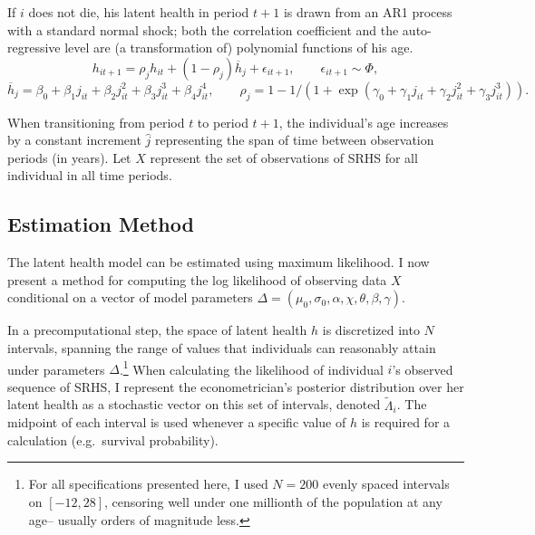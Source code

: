 \documentclass[12pt,pdftex,letterpaper]{article}
\newcommand{\Health}{h}
\newcommand{\ExpHealth}{\overline{\Health}}
\newcommand{\Age}{j}
\newcommand{\AgeIncr}{\hat{\Age}}
\newcommand{\Corr}{\rho}
\newcommand{\HealthInitMean}{\mu_0}
\newcommand{\HealthInitStd}{\sigma_0}
\newcommand{\Cut}{\chi}
\newcommand{\MortParam}{\theta}
\newcommand{\CorrParam}{\gamma}
\newcommand{\HealthParam}{\beta}
\newcommand{\LatentParam}{\alpha}
\newcommand{\HealthShock}{\epsilon}
\newcommand{\Data}{X}
\newcommand{\ParamVec}{\Delta}
\newcommand{\HealthDstnPcvd}{\widetilde{\Lambda}}
\begin{document}
If $i$ does not die, his latent health in period $t+1$ is drawn from an AR1 process with a standard normal shock; both the correlation coefficient and the auto-regressive level are (a transformation of) polynomial functions of his age.
\begin{equation}\label{HealthNext}
\Health_{it+1} = \Corr_{j} \Health_{it} + (1-\Corr_j) \ExpHealth_\Age + \HealthShock_{it+1}, \qquad \HealthShock_{it+1} \sim \Phi,
\end{equation}
\begin{equation*}
\ExpHealth_{\Age} = \HealthParam_0 + \HealthParam_1 \Age_{it} + \HealthParam_2 \Age_{it}^2 + \HealthParam_3 \Age_{it}^3 + \HealthParam_4 \Age_{it}^4, \qquad \Corr_{\Age} = 1 - 1 \big/ (1 + \exp(\CorrParam_0 + \CorrParam_1 \Age_{it} + \CorrParam_2 \Age_{it}^2 + \CorrParam_3 \Age_{it}^3)).
\end{equation*}

When transitioning from period $t$ to period $t+1$, the individual's age increases by a constant increment $\AgeIncr$ representing the span of time between observation periods (in years).  Let $\Data$ represent the set of observations of SRHS for all individual in all time periods.


\subsection{Estimation Method}\label{sec:Estimation}

The latent health model can be estimated using maximum likelihood.  I now present a method for computing the log likelihood of observing data $\Data$ conditional on a vector of model parameters $\ParamVec = (\HealthInitMean,\HealthInitStd,\LatentParam,\Cut,\MortParam,\HealthParam,\CorrParam)$.

In a precomputational step, the space of latent health $\Health$ is discretized into $N$ intervals, spanning the range of values that individuals can reasonably attain under parameters $\Delta$.\footnote{For all specifications presented here, I used $N=200$ evenly spaced intervals on $[-12,28]$, censoring well under one millionth of the population at any age-- usually orders of magnitude less.}  When calculating the likelihood of individual $i$'s observed sequence of SRHS, I represent the econometrician's posterior distribution over her latent health as a stochastic vector on this set of intervals, denoted $\HealthDstnPcvd_i$.  The midpoint of each interval is used whenever a specific value of $\Health$ is required for a calculation (e.g.\ survival probability).
\end{document}
